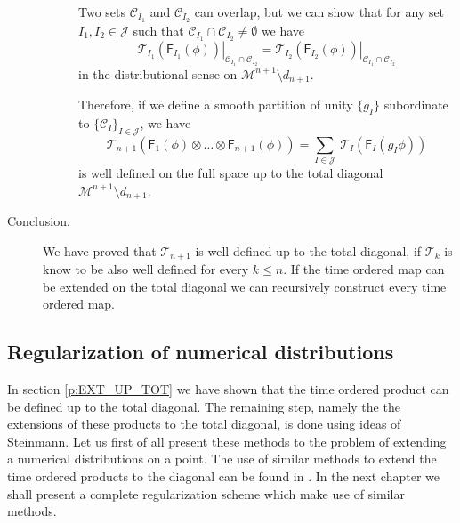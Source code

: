 \documentclass[11pt]{book}
\newcommand{\Ccal}{\mathcal{C}}
\newcommand{\Jcal}{\mathcal{J}}
\newcommand{\Mcal}{\mathcal{M}}
\newcommand{\Tcal}{\mathcal{T}}
\newcommand{\Fsf}{\mathsf{F}}
\theoremstyle{break}
\begin{document}
\begin{description}
\begin{description}
Two sets $\Ccal_{I_1}$ and $\Ccal_{I_2}$ can overlap, but we can show \cite[proposition 4.2]{brunetti_microlocal_2000} that for any set $I_1 , I_2 \in \Jcal$ such that $\Ccal_{I_1} \cap \Ccal_{I_2} \neq \emptyset$ we have 
%
\begin{equation*}
\left. \Tcal_{I_1}\left(\Fsf_{I_1}(\phi)\right) \right|_{\Ccal_{I_1} \cap \Ccal_{I_2}} = \left. \Tcal_{I_2}\left(\Fsf_{I_2}(\phi)\right) \right|_{\Ccal_{I_1} \cap \Ccal_{I_2}}
\end{equation*}
%
in the distributional sense on $\Mcal^{n+1}\setminus d_{n+1}$.


Therefore, if we define a smooth partition of unity $\{ g_I\}$  subordinate to $\{\Ccal_I\}_{I\in\Jcal}$, we have
%
\begin{equation*}
\Tcal_{n+1}\left(\Fsf_1(\phi) \otimes \dots \otimes \Fsf_{n+1}(\phi) \right) = \sum_{I\in\Jcal} \  \Tcal_{I}\left(\Fsf_I(g_I\phi)\right)  
\end{equation*}
%
is well defined on the full space up to the total diagonal $\Mcal^{n+1} \setminus d_{n+1}$. 


\end{description}


\item[Conclusion.] We have proved that $\Tcal_{n+1}$ is well defined up to the total diagonal, if $\Tcal_k$ is know to be also well defined for every $k\leq n$. If the time ordered map can be extended on the total diagonal we can recursively construct every time ordered map.


\end{description}


\subsection{Regularization of numerical distributions}
\label{p:REG_NUMERRIC}


In section \ref{p:EXT_UP_TOT} we have shown that the time ordered product can be defined up to the total diagonal. The remaining step, namely the the extensions of these products to the total diagonal, is done using ideas of Steinmann. Let us first of all present these methods to the problem of extending a numerical distributions on a point. The use of similar methods to extend the time ordered products to the diagonal can be found in \cite{brunetti_microlocal_2000}. In the next chapter we shall present a complete regularization scheme which make use of similar methods.
\end{document}
